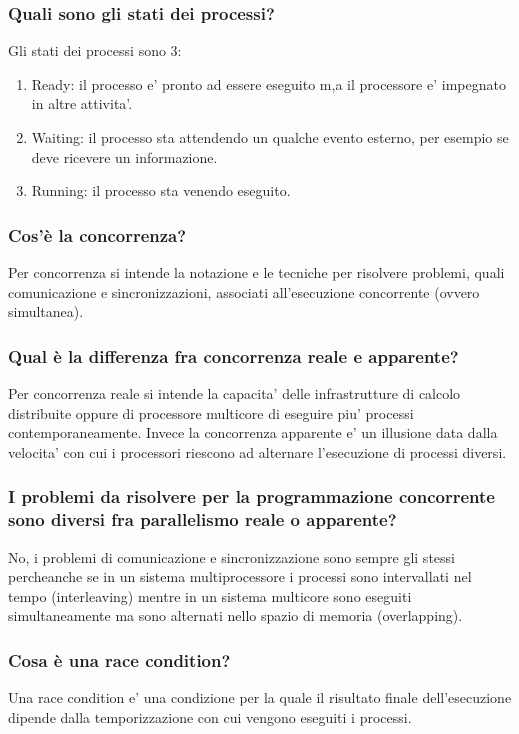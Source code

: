 \documentclass{article}
\begin{document}
\subsubsection{Quali sono gli stati dei processi?}
Gli stati dei processi sono 3:
\begin{enumerate}
    \item Ready: il processo e' pronto ad essere eseguito m,a il processore e' impegnato
          in altre attivita'.
    \item Waiting: il processo sta attendendo un qualche evento esterno, per esempio se
          deve ricevere un informazione.
    \item Running: il processo sta venendo eseguito.
\end{enumerate}

\subsubsection{Cos'è la concorrenza?}
Per concorrenza si intende la notazione e le tecniche per risolvere problemi,
quali comunicazione e sincronizzazioni, associati all'esecuzione concorrente
(ovvero simultanea).

\subsubsection{Qual è la differenza fra concorrenza reale e apparente?}
Per concorrenza reale si intende la capacita' delle infrastrutture di calcolo
distribuite oppure di processore multicore di eseguire piu' processi
contemporaneamente. Invece la concorrenza apparente e' un illusione data dalla
velocita' con cui i processori riescono ad alternare l'esecuzione di processi
diversi.

\subsubsection{I problemi da risolvere per la programmazione concorrente sono diversi
    fra parallelismo reale o apparente?}
No, i problemi di comunicazione e sincronizzazione sono sempre gli stessi
percheanche se in un sistema multiprocessore i processi sono intervallati nel
tempo (interleaving) mentre in un sistema multicore sono eseguiti
simultaneamente ma sono alternati nello spazio di memoria (overlapping).

\subsubsection{Cosa è una race condition?}
Una race condition e' una condizione per la quale il risultato finale
dell'esecuzione dipende dalla temporizzazione con cui vengono eseguiti i
processi.
\end{document}
